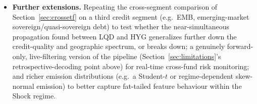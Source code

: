 \documentclass[11pt]{article}
\theoremstyle{definition}
\theoremstyle{remark}
\begin{document}
\begin{itemize}
    \item \textbf{Further extensions.} Repeating the cross-segment comparison of Section~\ref{sec:crossetf} on a third credit segment (e.g.\ EMB, emerging-market sovereign/quasi-sovereign debt) to test whether the near-simultaneous propagation found between LQD and HYG generalizes further down the credit-quality and geographic spectrum, or breaks down; a genuinely forward-only, live-filtering version of the pipeline (Section~\ref{sec:limitations}'s retrospective-decoding point above) for real-time cross-fund risk monitoring; and richer emission distributions (e.g.\ a Student-$t$ or regime-dependent skew-normal emission) to better capture fat-tailed feature behaviour within the Shock regime.
\end{itemize}

\end{document}

